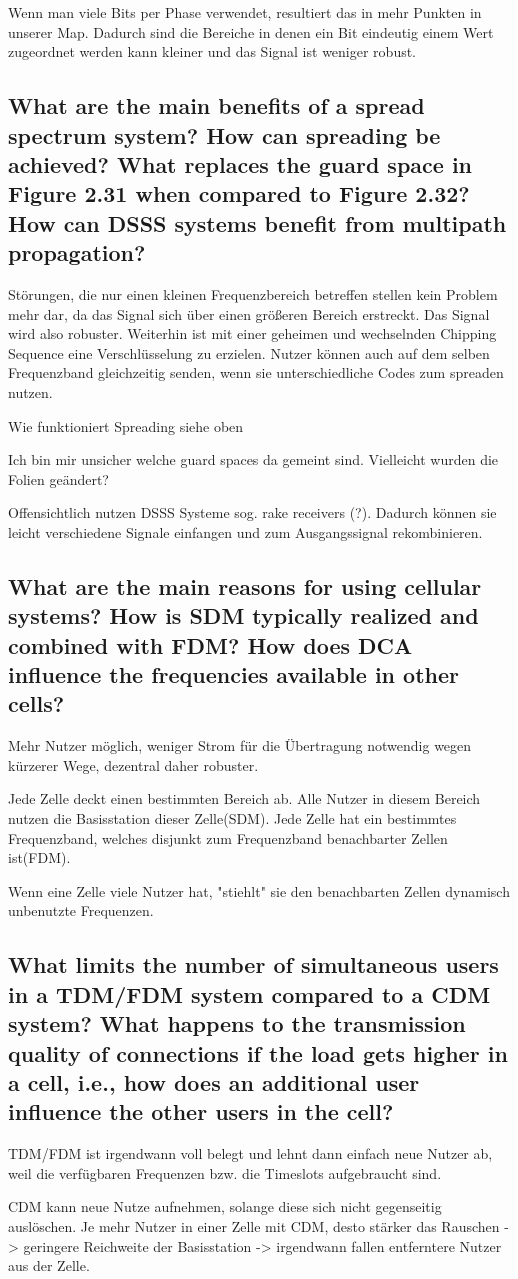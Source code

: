 Wenn man viele Bits per Phase verwendet, resultiert das in mehr Punkten in unserer Map. Dadurch sind die Bereiche in denen ein Bit eindeutig einem Wert zugeordnet werden kann kleiner und das Signal ist weniger robust.


\subsection{What are the main benefits of a spread spectrum system? How can spreading be
achieved? What replaces the guard space in Figure 2.31 when compared to Figure
2.32? How can DSSS systems benefit from multipath propagation?}
Störungen, die nur einen kleinen Frequenzbereich betreffen stellen kein Problem mehr dar, da das Signal sich über einen größeren Bereich erstreckt. Das Signal wird also robuster. Weiterhin ist mit einer geheimen und wechselnden Chipping Sequence eine Verschlüsselung zu erzielen. Nutzer können auch auf dem selben Frequenzband gleichzeitig senden, wenn sie unterschiedliche Codes zum spreaden nutzen.

Wie funktioniert Spreading siehe oben

Ich bin mir unsicher welche guard spaces da gemeint sind. Vielleicht wurden die Folien geändert?

Offensichtlich nutzen DSSS Systeme sog. rake receivers (?). Dadurch können sie leicht verschiedene Signale einfangen und zum Ausgangssignal rekombinieren.


\subsection{What are the main reasons for using cellular systems? How is SDM typically realized
and combined with FDM? How does DCA influence the frequencies available in other
cells?}
Mehr Nutzer möglich, weniger Strom für die Übertragung notwendig wegen kürzerer Wege, dezentral daher robuster.

Jede Zelle deckt einen bestimmten Bereich ab. Alle Nutzer in diesem Bereich nutzen die Basisstation dieser Zelle(SDM).
Jede Zelle hat ein bestimmtes Frequenzband, welches disjunkt zum Frequenzband benachbarter Zellen ist(FDM). 

Wenn eine Zelle viele Nutzer hat, "stiehlt" sie den benachbarten Zellen dynamisch unbenutzte Frequenzen.

\subsection{What limits the number of simultaneous users in a TDM/FDM system compared to a
CDM system? What happens to the transmission quality of connections if the load
gets higher in a cell, i.e., how does an additional user influence the other users in the
cell?}
TDM/FDM ist irgendwann voll belegt und lehnt dann einfach neue Nutzer ab, weil die verfügbaren Frequenzen bzw. die Timeslots aufgebraucht sind.

CDM kann neue Nutze aufnehmen, solange diese sich nicht gegenseitig auslöschen. Je mehr Nutzer in einer Zelle mit CDM, desto stärker das Rauschen -> geringere Reichweite der Basisstation -> irgendwann fallen entferntere Nutzer aus der Zelle.



